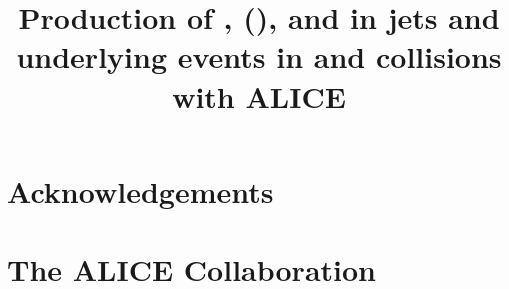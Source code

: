 \documentclass[ALICE,manyauthors]{cernphprep}
\begin{document}
\begin{titlepage}

\title{Production of \kzero, \lmb (\almb), \Xis and \Oms in jets and underlying events in \pp and \pPb collisions with ALICE}


\begin{abstract}

\end{abstract}
\end{titlepage}

\setcounter{page}{2} %





\newenvironment{acknowledgement}{\relax}{\relax}
\begin{acknowledgement}
\section*{Acknowledgements}
%
\end{acknowledgement}




\newpage
\appendix


\section{The ALICE Collaboration}
\label{app:collab}
%
\end{document}
